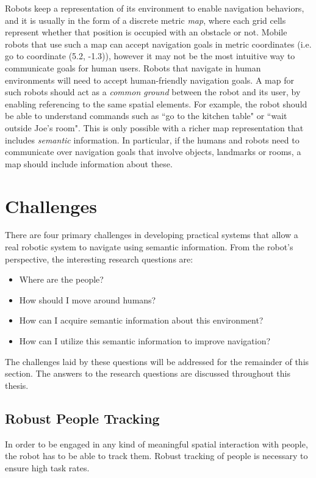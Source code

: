 \documentclass[12pt]{gatech-thesis}
\begin{document}
Robots keep a representation of its environment to enable navigation behaviors, and it is usually in the form of a discrete metric \textit{map}, where each grid cells represent whether that position is occupied with an obstacle or not. Mobile robots that use such a map can accept navigation goals in metric coordinates (i.e. go to coordinate (5.2, -1.3)), however it may not be the most intuitive way to communicate goals for human users. Robots that navigate in human environments will need to accept human-friendly navigation goals. A map for such robots should act as a \textit{common ground} between the robot and its user, by enabling referencing to the same spatial elements. For example, the robot should be able to understand commands such as ``go to the kitchen table" or ``wait outside Joe's room". This is only possible with a richer map representation that includes \textit{semantic} information. In particular, if the humans and robots need to communicate over navigation goals that involve objects, landmarks or rooms, a map should include information about these.

\section{Challenges}

There are four primary challenges in developing practical systems that allow a real robotic system to navigate using semantic information. From the robot's perspective, the interesting research questions are:

\begin{itemize}
\item Where are the people?
\item How should I move around humans?
\item How can I acquire semantic information about this environment?
\item How can I utilize this semantic information to improve navigation?
\end{itemize}

The challenges laid by these questions will be addressed for the remainder of this section. The answers to the research questions are discussed throughout this thesis.

\subsection{Robust People Tracking}

In order to be engaged in any kind of meaningful spatial interaction with people, the robot has to be able to track them. Robust tracking of people is necessary to ensure high task rates.
\end{document}
